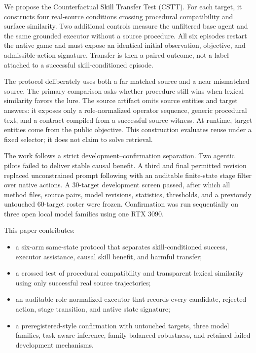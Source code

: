 \documentclass[pdflatex,sn-mathphys-num]{sn-jnl}
\begin{document}
We propose the Counterfactual Skill Transfer Test (CSTT). For each target, it
constructs four real-source conditions crossing procedural compatibility and
surface similarity. Two additional controls measure the unfiltered base agent
and the same grounded executor without a source procedure. All six episodes
restart the native game and must expose an identical initial observation,
objective, and admissible-action signature. Transfer is then a paired outcome,
not a label attached to a successful skill-conditioned episode.

The protocol deliberately uses both a far matched source and a near mismatched
source. The primary comparison asks whether procedure still wins when lexical
similarity favors the lure. The source artifact omits source entities and target
answers: it exposes only a role-normalized operator sequence, generic procedural
text, and a contract compiled from a successful source witness. At runtime,
target entities come from the public objective. This construction evaluates
reuse under a fixed selector; it does not claim to solve retrieval.

The work follows a strict development--confirmation separation. Two agentic
pilots failed to deliver stable causal benefit. A third and final permitted
revision replaced unconstrained prompt following with an auditable finite-state
stage filter over native actions. A 30-target development screen passed, after
which all method files, source pairs, model revisions, statistics, thresholds,
and a previously untouched 60-target roster were frozen. Confirmation was run
sequentially on three open local model families using one RTX 3090.

This paper contributes:
\begin{itemize}
  \item a six-arm same-state protocol that separates skill-conditioned success,
  executor assistance, causal skill benefit, and harmful transfer;
  \item a crossed test of procedural compatibility and transparent lexical
  similarity using only successful real source trajectories;
  \item an auditable role-normalized executor that records every candidate,
  rejected action, stage transition, and native state signature;
  \item a preregistered-style confirmation with untouched targets, three model
  families, task-aware inference, family-balanced robustness, and retained
  failed development mechanisms.
\end{itemize}
\end{document}
